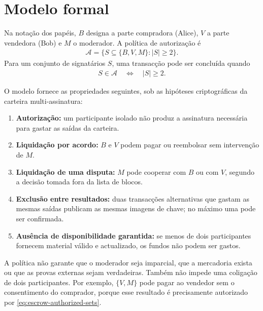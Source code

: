 \section{Modelo formal}
\label{sec:escrow-formal-model}

Na notação dos papéis, \(B\) designa a parte compradora (Alice), \(V\) a parte vendedora (Bob) e \(M\) o moderador. A política
de autorização é
\begin{align}
 \mathcal A
 =\bigl\{S\subseteq\{B,V,M\}:|S|\geq2\bigr\}.
 \label{eq:escrow-authorized-sets}
\end{align}
Para um conjunto de signatários \(S\), uma transacção pode ser concluída
quando
\begin{align}
 S\in\mathcal A
 \quad\Longleftrightarrow\quad
 |S|\geq 2.
 \label{eq:escrow-threshold}
\end{align}

O modelo fornece as propriedades seguintes, sob as hipóteses criptográficas
da carteira multi-assinatura:

\begin{enumerate}
 \item \textbf{Autorização:} um participante isolado não produz a assinatura
 necessária para gastar as saídas da carteira.

 \item \textbf{Liquidação por acordo:} \(B\) e \(V\) podem pagar ou reembolsar
 sem intervenção de \(M\).

 \item \textbf{Liquidação de uma disputa:} \(M\) pode cooperar com \(B\) ou
 com \(V\), segundo a decisão tomada fora da lista de blocos.

 \item \textbf{Exclusão entre resultados:} duas transacções alternativas que
 gastam as mesmas saídas publicam as mesmas imagens de chave; no máximo uma
 pode ser confirmada.

 \item \textbf{Ausência de disponibilidade garantida:} se menos de dois
 participantes fornecem material válido e actualizado, os fundos não podem
 ser gastos.
\end{enumerate}

A política não garante que o moderador seja imparcial, que a mercadoria exista
ou que as provas externas sejam verdadeiras. Também não impede uma coligação
de dois participantes. Por exemplo, \(\{V,M\}\) pode pagar ao vendedor sem o
consentimento do comprador, porque esse resultado é precisamente autorizado
por \eqref{eq:escrow-authorized-sets}.

